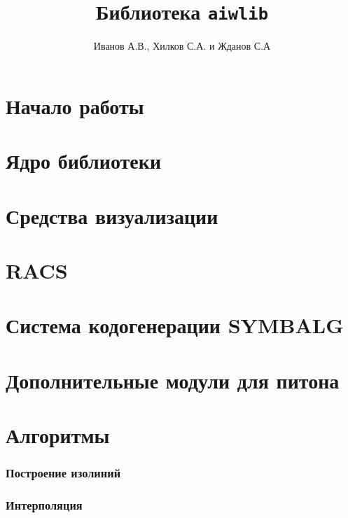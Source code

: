 \documentclass[12pt]{book}
\begin{document}
\title{Библиотека {\tt aiwlib}}
\author{
Иванов А.В., Хилков С.А. и Жданов С.А
}

\maketitle

\tableofcontents


\chapter{Начало работы} %
% 



\chapter{Ядро библиотеки}




\chapter{Средства визуализации}

\chapter{RACS}

\chapter{Система кодогенерации SYMBALG}

\chapter{Дополнительные модули для питона}

\chapter{Алгоритмы}
\subsection{Построение изолиний}
\subsection{Интерполяция}
\end{document}
